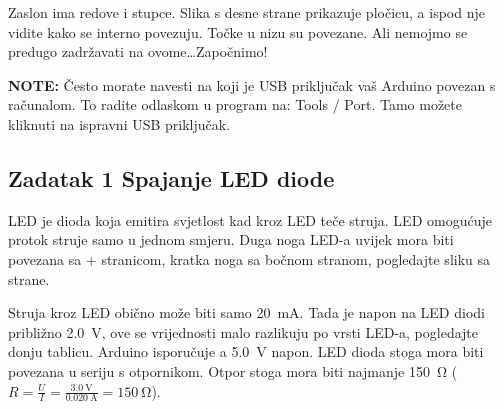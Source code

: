 \documentclass{arduino}
\begin{document}
Zaslon ima redove i stupce. Slika s desne strane prikazuje pločicu, a ispod nje vidite kako se interno povezuju. Točke u nizu su povezane. Ali nemojmo se predugo zadržavati na ovome\dots Započnimo!

\textbf{NOTE:} Često morate navesti na koji je USB priključak vaš Arduino povezan s računalom. To radite odlaskom u program na: Tools / Port. Tamo možete kliknuti na ispravni USB priključak.

\newpage

\subsection{Zadatak 1 Spajanje LED diode}

LED je dioda koja emitira svjetlost kad kroz LED teče struja. LED omogućuje protok struje samo u jednom smjeru. Duga noga LED-a uvijek mora biti povezana sa + stranicom, kratka noga sa bočnom stranom, pogledajte sliku sa strane.

Struja kroz LED obično može biti samo \SI{20}{\milli\ampere}. Tada je napon na LED diodi približno \SI{2.0}{\volt}, ove se vrijednosti malo razlikuju po vrsti LED-a, pogledajte donju tablicu. Arduino isporučuje a \SI{5.0}{\volt} napon. LED dioda stoga mora biti povezana u seriju s otpornikom. Otpor stoga mora biti najmanje \SI{150}{\ohm} ($R = \frac{U}{I} = \frac{\SI{3.0}{\volt}}{\SI{0.020}{\ampere}} = \SI{150}{\ohm}$).
\end{document}
